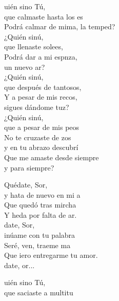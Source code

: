 \begin{cancion}%
	uién sino Tú,\\
	que calmaste hasta los es\\
	Podrá calmar de mima, la temped?\\
	¿Quién sinú, \\
	que llenaste solees,\\
	Podrá dar a mi espnza, \\
	un nuevo ar?\\
	¿Quién sinú, \\
	que después de tantosos, \\
	Y a pesar de mis recos,\\
	sigues dándome tuz?\\
	¿Quién sinú, \\
	que a pesar de mis peos\\
	No te cruzaste de zos\\
	\jump
y en tu abrazo descubrí\\
	\jump
Que me amaste desde siempre \\
	\jump
y para siempre?\jump\\
	\begin{chorus}%
		Quédate, Sor,\\
		y hata de nuevo en mi a\\
		Que  quedó tras mircha\\
		Y heda por falta de ar.\\
		date, Sor, \\
		inúame con tu palabra\\
		Seré, ven, traeme ma \\
		Que iero entregarme tu amor.\\
		date, or...          \jump\\
	\end{chorus}%
	uién sino Tú,\\
	que saciaste a multitu\\

\end{cancion}
